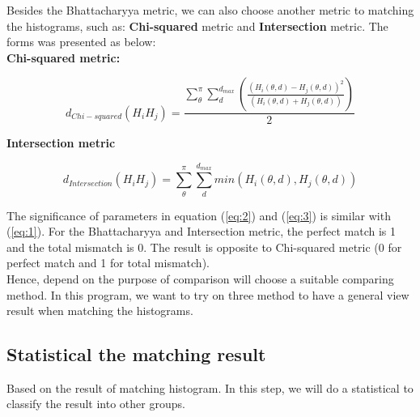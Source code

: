 Besides the Bhattacharyya metric, we can also choose another metric to matching the histograms, such as: \textbf{Chi-squared} metric and \textbf{Intersection} metric. The forms was presented as below:\\
\textbf{Chi-squared metric:}
\begin{center}
\begin{equation}\label{eq:2}
d_{Chi-squared} (H_{i}H_{j}) = \frac{\sum\limits_{\theta}^{\pi}\sum\limits_{d}^{d_{max}}(\frac{(H_{i}(\theta,d) - H_{j}(\theta,d))^{2}}{(H_{i}(\theta,d) + H_{j}(\theta,d))})}{2}
\end{equation}
\end{center}
\textbf{Intersection metric}
\begin{center}
\begin{equation}\label{eq:3}
d_{Intersection} (H_{i}H_{j}) = \sum\limits_{\theta}^{\pi}\sum\limits_{d}^{d_{max}}min(H_{i}(\theta,d), H_{j}(\theta,d))
\end{equation}
\end{center}
The significance of parameters in equation (\ref{eq:2}) and (\ref{eq:3}) is similar with (\ref{eq:1}). For the Bhattacharyya and Intersection metric, the perfect match is 1 and the total mismatch is 0. The result is opposite to Chi-squared metric (0 for perfect match and 1 for total mismatch).\\[0.2cm]
Hence, depend on the purpose of comparison will choose a suitable comparing method. In this program, we want to try on three method to have a general view result when matching the histograms.
\subsection{Statistical the matching result}
Based on the result of matching histogram. In this step, we will do a statistical to classify the result into other groups.
































